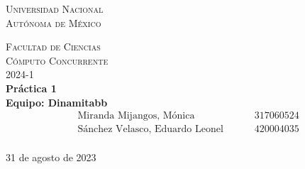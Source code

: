  \thispagestyle{empty}

\begin{center}
    \begin{minipage}{0.29\textwidth}                
    \end{minipage}
    \begin{minipage}{0.40\textwidth} 
        \textsc{\Large Universidad Nacional \\[5mm] Autónoma de México}
    \end{minipage}
    \begin{minipage}{0.29\textwidth}        
    \end{minipage}
    \vspace{5mm}					
    
    \textsc{\Large Facultad de Ciencias}\\[35mm]
    
    \textsc{\huge   Cómputo Concurrente\\[2mm]}
                  {\Large 2024-1}\\[25mm]
    
    \textbf{\huge Práctica 1}\\[20mm]
    \textbf{\huge Equipo: Dinamitabb}\\[20mm]
    
    \Large 
    \begin{align*}            
            &\text{Miranda Mijangos, Mónica} & \text{317060524}\\[1mm]
            &\text{Sánchez Velasco, Eduardo Leonel } \qquad& \text{420004035} 
            \\[20mm]
    \end{align*}

    
    \large 31 de agosto de 2023

\end{center}	
\newpage